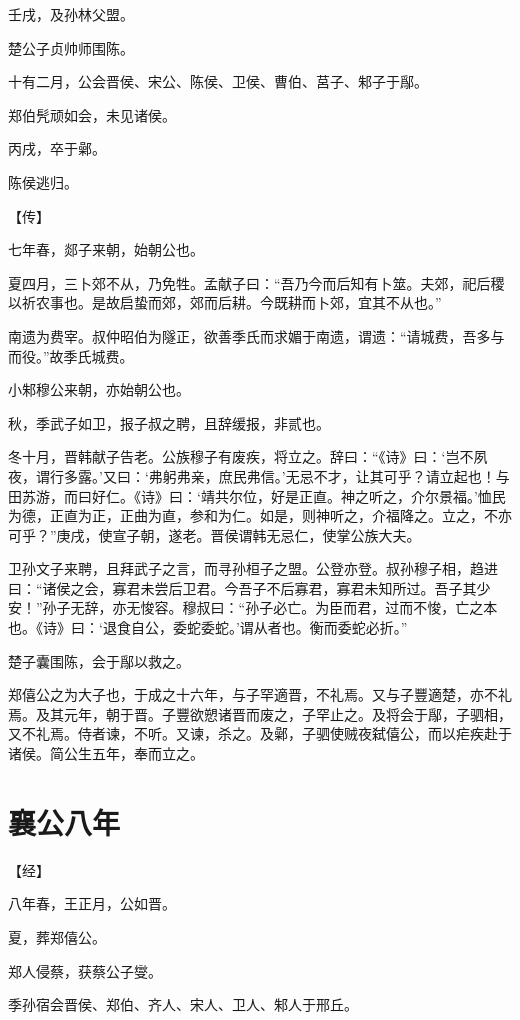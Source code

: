 \documentclass[a4paper,12pt,UTF8,twoside]{ctexbook}
\begin{document}
壬戌，及孙林父盟。

楚公子贞帅师围陈。

十有二月，公会晋侯、宋公、陈侯、卫侯、曹伯、莒子、邾子于鄬。

郑伯髠顽如会，未见诸侯。

丙戌，卒于鄵。

陈侯逃归。

【传】

七年春，郯子来朝，始朝公也。

夏四月，三卜郊不从，乃免牲。孟献子曰：“吾乃今而后知有卜筮。夫郊，祀后稷以祈农事也。是故启蛰而郊，郊而后耕。今既耕而卜郊，宜其不从也。”

南遗为费宰。叔仲昭伯为隧正，欲善季氏而求媚于南遗，谓遗：“请城费，吾多与而役。”故季氏城费。

小邾穆公来朝，亦始朝公也。

秋，季武子如卫，报子叔之聘，且辞缓报，非贰也。

冬十月，晋韩献子告老。公族穆子有废疾，将立之。辞曰：“《诗》曰：‘岂不夙夜，谓行多露。’又曰：‘弗躬弗亲，庶民弗信。’无忌不才，让其可乎？请立起也！与田苏游，而曰好仁。《诗》曰：‘靖共尔位，好是正直。神之听之，介尔景福。’恤民为德，正直为正，正曲为直，参和为仁。如是，则神听之，介福降之。立之，不亦可乎？”庚戌，使宣子朝，遂老。晋侯谓韩无忌仁，使掌公族大夫。

卫孙文子来聘，且拜武子之言，而寻孙桓子之盟。公登亦登。叔孙穆子相，趋进曰：“诸侯之会，寡君未尝后卫君。今吾子不后寡君，寡君未知所过。吾子其少安！”孙子无辞，亦无悛容。穆叔曰：“孙子必亡。为臣而君，过而不悛，亡之本也。《诗》曰：‘退食自公，委蛇委蛇。’谓从者也。衡而委蛇必折。”

楚子囊围陈，会于鄬以救之。

郑僖公之为大子也，于成之十六年，与子罕適晋，不礼焉。又与子豐適楚，亦不礼焉。及其元年，朝于晋。子豐欲愬诸晋而废之，子罕止之。及将会于鄬，子驷相，又不礼焉。侍者谏，不听。又谏，杀之。及鄵，子驷使贼夜弑僖公，而以疟疾赴于诸侯。简公生五年，奉而立之。


\chapter{襄公八年}



【经】

八年春，王正月，公如晋。

夏，葬郑僖公。

郑人侵蔡，获蔡公子燮。

季孙宿会晋侯、郑伯、齐人、宋人、卫人、邾人于邢丘。
\end{document}

